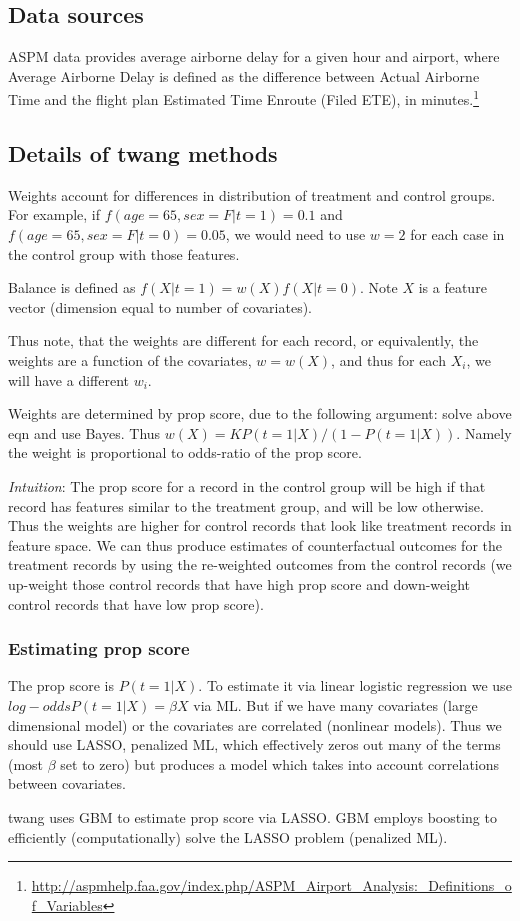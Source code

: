 \documentclass[11pt]{scrartcl}
\begin{document}
\subsection{Data sources}
ASPM data provides average airborne delay for a given hour and airport, where Average Airborne Delay is defined as the difference between Actual Airborne Time and the flight plan Estimated Time Enroute (Filed ETE), in minutes.\footnote{\url{http://aspmhelp.faa.gov/index.php/ASPM_Airport_Analysis:_Definitions_of_Variables}}

\subsection{Details of twang methods}
Weights account for differences in distribution of treatment and control groups.  For example, if $f(age=65, sex=F|t=1)=0.1$ and $f(age=65, sex=F|t=0)=0.05$, we would need to use $w=2$ for each case in the control group with those features.  

Balance is defined as $f(X|t=1) = w(X) f(X|t=0)$.  Note $X$ is a feature vector (dimension equal to number of covariates).  

Thus note, that the weights are different for each record, or equivalently, the weights are a function of the covariates, $w=w(X)$, and thus for each $X_i$, we will have a different $w_i$.  

Weights are determined by prop score, due to the following argument:  solve above eqn and use Bayes.  Thus $w(X) = K P(t=1|X)/(1-P(t=1|X))$.  Namely the weight is proportional to odds-ratio of the prop score.

\emph{Intuition}: The prop score for a record in the control group will be high if that record has features similar to the treatment group, and will be low otherwise.  Thus the weights are higher for control records that look like treatment records in feature space.  We can thus produce estimates of counterfactual outcomes for the treatment records by using the re-weighted outcomes from the control records (we up-weight those control records that have high prop score and down-weight control records that have low prop score).  

\subsubsection{Estimating prop score}
The prop score is $P(t=1|X)$.  To estimate it via linear logistic regression we use $log-odds P(t=1|X) = \beta X$ via ML.  But if we have many covariates (large dimensional model) or the covariates are correlated (nonlinear models).  Thus we should use LASSO, penalized ML, which effectively zeros out many of the terms (most $\beta$ set to zero) but produces a model which takes into account correlations between covariates.  

twang uses GBM to estimate prop score via LASSO.  GBM employs boosting to efficiently (computationally) solve the LASSO problem (penalized ML).
 


\end{document}
